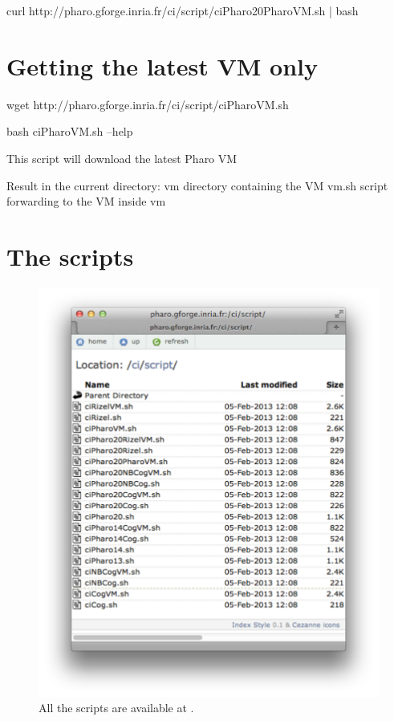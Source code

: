 \documentclass[a4paper,10pt,twoside]{book}
\begin{document}
\begin{code}{}
curl http://pharo.gforge.inria.fr/ci/script/ciPharo20PharoVM.sh | bash
\end{code}


\section{Getting the latest VM only}

\begin{code}{}
wget http://pharo.gforge.inria.fr/ci/script/ciPharoVM.sh
\end{code}

\begin{code}{}
bash ciPharoVM.sh --help


This script will download the latest Pharo VM

Result in the current directory:
    vm               directory containing the VM
    vm.sh            script forwarding to the VM inside vm
\end{code}





\section{The scripts}

\begin{figure}[!h]
	\centering
	\includegraphics[width=\textwidth]{webSite}
	\caption{All the scripts are available at  \label{fig:website}.}
\end{figure}
	
\end{document}

